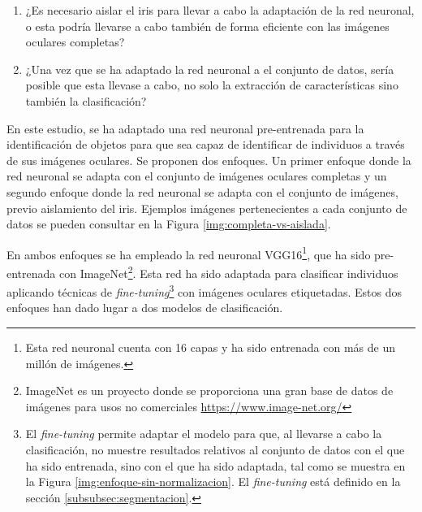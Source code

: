 \begin{enumerate}
    \item ¿Es necesario aislar el iris para llevar a cabo la adaptación de la red neuronal, o esta podría llevarse a cabo también de forma eficiente con las imágenes oculares completas?
    \item ¿Una vez que se ha adaptado la red neuronal a el conjunto de datos, sería posible que esta llevase a cabo, no solo la extracción de características sino también la clasificación?
\end{enumerate}


En este estudio, se ha adaptado una red neuronal pre-entrenada para la identificación de objetos para que sea capaz de identificar de individuos a través de sus imágenes oculares. Se proponen dos enfoques. Un primer enfoque donde la red neuronal se adapta con el conjunto de imágenes oculares completas y un segundo enfoque donde la red neuronal se adapta con el conjunto de imágenes, previo aislamiento del iris. Ejemplos imágenes pertenecientes a cada conjunto de datos se pueden consultar en la Figura \ref{img:completa-vs-aislada}.   


En ambos enfoques se ha empleado la red neuronal VGG16\footnote{Esta red neuronal cuenta con 16 capas y ha sido entrenada con más de un millón de imágenes.}, que ha sido pre-entrenada con ImageNet\footnote{ImageNet es un proyecto donde se proporciona 
una gran base de datos de imágenes para usos no comerciales \url{https://www.image-net.org/}}. Esta red ha sido adaptada para clasificar individuos aplicando técnicas de \textit{fine-tuning}\footnote{El \textit{fine-tuning} 
permite adaptar el modelo para que, al llevarse a cabo la clasificación, no muestre resultados relativos al conjunto de datos con el que ha sido entrenada, sino con el que ha sido adaptada, tal como se muestra en la Figura \ref{img:enfoque-sin-normalizacion}. El \textit{fine-tuning} está definido en la sección \ref{subsubsec:segmentacion}.}
 con imágenes oculares etiquetadas. Estos dos enfoques han dado lugar a dos modelos de clasificación. 

